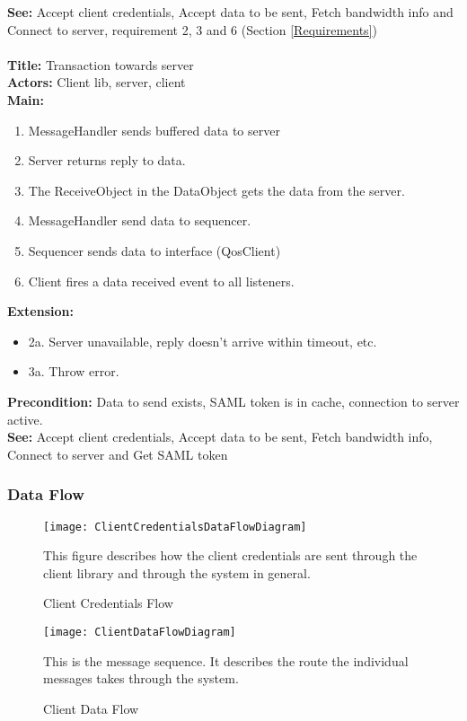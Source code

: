 		\textbf{See:} Accept client credentials, Accept data to be sent, Fetch bandwidth info and Connect to server, requirement 2, 3 and 6 (Section \ref{Requirements})
		\\\\
		\textbf{Title:} Transaction towards server \\
		\textbf{Actors:} Client lib, server, client \\
		\textbf{Main:}
		\begin{enumerate}
			\item MessageHandler sends buffered data to server
			\item Server returns reply to data.
			\item The ReceiveObject in the DataObject gets the data from the server.
			\item MessageHandler send data to sequencer.
			\item Sequencer sends data to interface (QosClient)
			\item Client fires a data received event to all listeners.
		\end{enumerate}
		\textbf{Extension:}
		\begin{itemize}
			 \item[] 2a. Server unavailable, reply doesn't arrive within timeout, etc.
			 \item[] 3a. Throw error.
		\end{itemize}
		\textbf{Precondition:} Data to send exists, SAML token is in cache, connection to server active.\\
		\textbf{See:} Accept client credentials, Accept data to be sent, Fetch bandwidth info, Connect to server and Get SAML token
		
	\subsubsection{Data Flow}\label{textual client data flow}
        
    \begin{figure}[h]
        \centering
        \texttt{[image: ClientCredentialsDataFlowDiagram]}
        \caption{Client Credentials Flow}
        This figure describes how the client credentials are sent through the client library and through the system in general. 
        \label{fig:ClientCredentialsDataFlowDiagram}
    \end{figure}
    
    \begin{figure}[h]
        \centering
        \texttt{[image: ClientDataFlowDiagram]}
        \caption{Client Data Flow}
        This is the message sequence. It describes the route the individual messages takes through the system. 
        \label{fig:ClientDataFlowDiagram}
    \end{figure}
    

